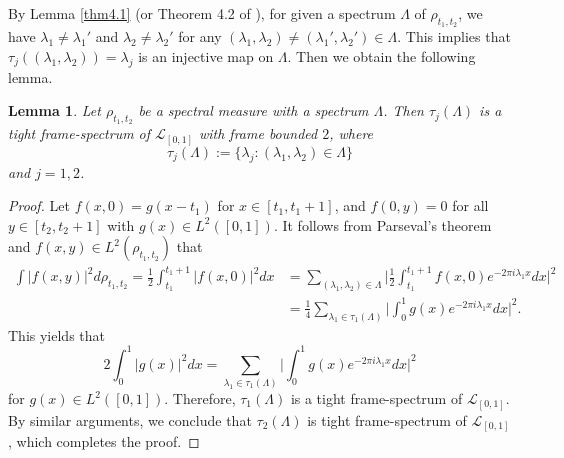 \documentclass[12pt,psfig,reqno]{amsart}
\numberwithin{equation}{section}
\theoremstyle{plain}
\newtheorem{lem}[thm]{Lemma}
\begin{document}
By Lemma \ref{thm4.1} (or Theorem 4.2 of \cite{LLP21}), for given a spectrum $\Lambda$ of $\rho_{t_1,t_2}$, we have $\lambda_1\neq\lambda_1'$ and $\lambda_2\neq \lambda_2'$ for any $(\lambda_1,\lambda_2)\neq(\lambda_1',\lambda_2')\in\Lambda$. 
This implies that $\tau_j((\lambda_1,\lambda_2))=\lambda_j$ is an injective map on $\Lambda$. 
Then we obtain the following lemma. 


\begin{lem}\label{thm4.2}
	Let $\rho_{t_1,t_2}$ be a spectral measure with a spectrum $\Lambda$. 
	Then $\tau_j(\Lambda)$ is a tight frame-spectrum of $\mathcal{L}_{[0,1]}$ with frame bounded $2$, where $$\tau_j(\Lambda):=\{\lambda_j:(\lambda_1,\lambda_2)\in\Lambda\}  
	$$ and $j=1,2$. 
\end{lem}
\begin{proof}
Let $f(x,0)=g(x-t_1)$ for $x\in[t_1,t_1+1]$, and $f(0,y)=0$ for all $y\in[t_2,t_2+1]$ with $g(x)\in L^2([0,1])$.  
It follows from Parseval's theorem and  $f(x,y)\in L^2(\rho_{t_1,t_2})$ that 
\begin{align*}
\int |f(x,y)|^2d\rho_{t_1,t_2}=\frac12\int_{t_1}^{t_1+1}|f(x,0)|^2dx
&=\sum_{(\lambda_1,\lambda_2)\in\Lambda}
\Big|\frac12\int_{t_1}^{t_1+1}f(x,0)e^{-2\pi i\lambda_1x}dx\Big|^2
\\
&=\frac14\sum_{\lambda_1\in\tau_1(\Lambda)}\Big|\int_0^{1}g(x)e^{-2\pi i\lambda_1x}dx\Big|^2.
\end{align*}
This yields that $$
2\int_0^1|g(x)|^2dx=\sum_{\lambda_1\in\tau_1(\Lambda)}\Big|\int_0^{1}g(x)e^{-2\pi i\lambda_1x}dx\Big|^2
$$
for $g(x)\in L^2([0,1]                                                                                                                                                                                                                                                                                                                                                                                                                                                                                                                                                                                                                                                                                                                                                                                                                                                                            )$. 
Therefore, $\tau_1(\Lambda)$ is a tight frame-spectrum of $\mathcal{L}_{[0,1]}$. By similar arguments, we conclude that  $\tau_2(\Lambda)$ is tight frame-spectrum of $\mathcal{L}_{[0,1]}$, which completes the proof.
\end{proof}
\end{document}
